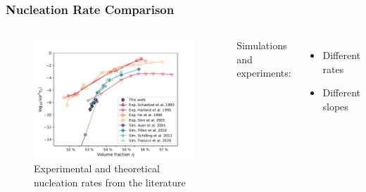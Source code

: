 \documentclass[smaller,notes=hide]{beamer}
\newlength{\wideitemsep}
\let\olditem\item
\renewcommand{\item}{\setlength{\itemsep}{\wideitemsep}\olditem}
\begin{document}
\begin{frame}
\frametitle{Nucleation Rate Comparison}
\begin{columns}
\begin{figure}[h]
\centering
\includegraphics[width=1 \linewidth]{nucleation_comparison_v2.pdf}
\caption[]{Experimental and theoretical nucleation rates from the literature\cite{Harland1997,He1996,schaetzel1993,Sinn2001,Auer2001,Filion2010a,Fiorucci2020a,Schilling2011}}
\end{figure}

Simulations and experiments:\\

\begin{itemize}
\item Different rates
\item Different slopes
\end{itemize}
\end{columns}
\end{frame}
\end{document}
